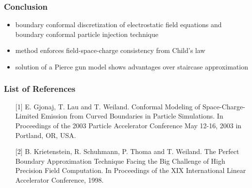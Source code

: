 \documentclass[colorbacktitle,inverttitle,landscape,presentation,
	english,
	aspectratio=43, %
	accentcolor=tud9b, %
]{tudbeamer}
\begin{document}
\begin{frame}
\frametitle{Conclusion}
	\begin{itemize}
	\item boundary conformal discretization of electrostatic field equations and boundary conformal particle injection technique
	
	\item method enforces field-space-charge consistency from Child's law
	
	\item solution of a Pierce gun model shows advantages over staircase approximation
	\end{itemize}
\end{frame}


\begin{frame}
\frametitle{List of References}
	\begin{enumerate}
	\item[{[1]}]
E. Gjonaj, T. Lau and T. Weiland. Conformal Modeling of Space-Charge-Limited Emission from Curved Boundaries in Particle Simulations. In Proceedings of the 2003 Particle Accelerator Conference May 12-16, 2003 in Portland, OR, USA.

	\item[{[2]}]
B. Krietenstein, R. Schuhmann, P. Thoma and T. Weiland. The Perfect Boundary Approximation Technique Facing the Big Challenge of High Precision Field Computation. In Proceedings of the XIX International Linear Accelerator Conference, 1998.
	\end{enumerate}
\end{frame}
	
	
\end{document}
